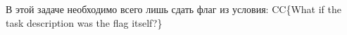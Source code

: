 
В этой задаче необходимо всего лишь сдать флаг из условия: CC\{What if the task description was the flag itself?\}

